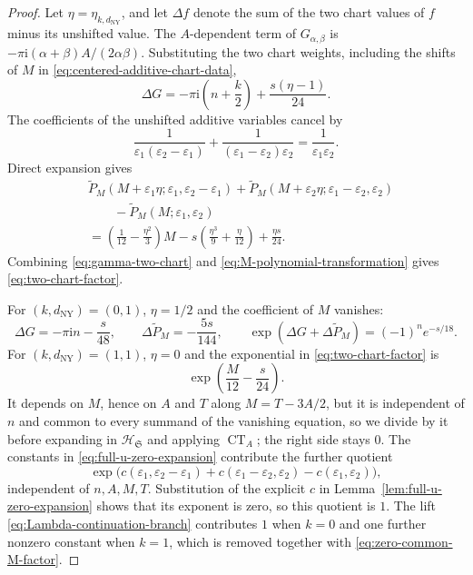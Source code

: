 \documentclass{amsart}
\theoremstyle{definition}
\numberwithin{equation}{section}
\newcommand{\eps}{\varepsilon}
\begin{document}
\begin{proof}
Let \(\eta=\eta_{k,d_{\mathrm{NY}}}\), and let \(\Delta f\) denote the sum of the two chart values of \(f\) minus its unshifted value.  The \(A\)-dependent term of \(G_{\alpha,\beta}\) is \(-\pi\mathrm{i}(\alpha+\beta)A/(2\alpha\beta)\).  Substituting the two chart weights, including the shifts of \(M\) in \eqref{eq:centered-additive-chart-data},
\begin{equation}
 \Delta G
 =-\pi\mathrm{i}\left(n+\frac k2\right)
  +\frac{s(\eta-1)}{24}.
\label{eq:gamma-two-chart}
\end{equation}
The coefficients of the unshifted additive variables cancel by
\[
 \frac1{\eps_1(\eps_2-\eps_1)}
 +\frac1{(\eps_1-\eps_2)\eps_2}
 =\frac1{\eps_1\eps_2}.
\]
Direct expansion gives
\begin{equation}
\begin{aligned}
 &\widetilde P_M
 (M+\eps_1\eta;\eps_1,\eps_2-\eps_1)
 +\widetilde P_M
 (M+\eps_2\eta;\eps_1-\eps_2,\eps_2)\\
 &\qquad-\widetilde P_M
 (M;\eps_1,\eps_2)\\
 &=\left(\frac1{12}-\frac{\eta^2}{3}\right)M
 -s\left(\frac{\eta^3}{9}+\frac{\eta}{12}\right)
 +\frac{\eta s}{24}.
\end{aligned}
\label{eq:M-polynomial-transformation}
\end{equation}
Combining \eqref{eq:gamma-two-chart} and \eqref{eq:M-polynomial-transformation} gives \eqref{eq:two-chart-factor}.

For \((k,d_{\mathrm{NY}})=(0,1)\), \(\eta=1/2\) and the coefficient of \(M\) vanishes:
\begin{equation}
 \Delta G=-\pi\mathrm{i}n-\frac{s}{48},\qquad
 \Delta\widetilde P_M=-\frac{5s}{144},
 \qquad
 \exp(\Delta G+\Delta\widetilde P_M)
 =(-1)^ne^{-s/18}.
\label{eq:unity-common-factor}
\end{equation}
For \((k,d_{\mathrm{NY}})=(1,1)\), \(\eta=0\) and the exponential in \eqref{eq:two-chart-factor} is
\begin{equation}
 \exp\left(\frac{M}{12}-\frac{s}{24}\right).
\label{eq:zero-common-M-factor}
\end{equation}
It depends on \(M\), hence on \(A\) and \(T\) along \(M=T-3A/2\), but it is independent of \(n\) and common to every summand of the vanishing equation, so we divide by it before expanding in \(\mathscr H_{\mathfrak S}\) and applying \(\operatorname{CT}_A\); the right side stays \(0\).  The constants in \eqref{eq:full-u-zero-expansion} contribute the further quotient
\[
 \exp\bigl(c(\eps_1,\eps_2-\eps_1)
 +c(\eps_1-\eps_2,\eps_2)-c(\eps_1,\eps_2)\bigr),
\]
independent of \(n,A,M,T\).  Substitution of the explicit \(c\) in Lemma~\ref{lem:full-u-zero-expansion} shows that its exponent is zero, so this quotient is \(1\).  The lift \eqref{eq:Lambda-continuation-branch} contributes \(1\) when \(k=0\) and one further nonzero constant when \(k=1\), which is removed together with \eqref{eq:zero-common-M-factor}.
\end{proof}
\end{document}

